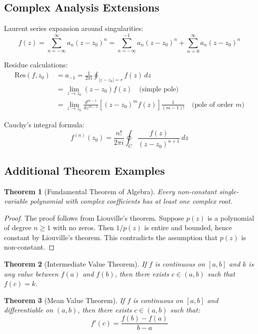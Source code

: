 \documentclass[12pt]{article}
\newtheorem{theorem}{Theorem}
\begin{document}
\subsection{Complex Analysis Extensions}

Laurent series expansion around singularities:
\begin{equation}
f(z) = \sum_{n=-\infty}^{\infty} a_n (z-z_0)^n = \sum_{n=-\infty}^{-1} a_n (z-z_0)^n + \sum_{n=0}^{\infty} a_n (z-z_0)^n
\end{equation}

Residue calculations:
\begin{align}
\text{Res}(f,z_0) &= a_{-1} = \frac{1}{2\pi i} \oint_{|z-z_0|=r} f(z) \, dz \\
&= \lim_{z \to z_0} (z-z_0) f(z) \quad \text{(simple pole)} \\
&= \lim_{z \to z_0} \frac{d^{m-1}}{dz^{m-1}} \left[(z-z_0)^m f(z)\right] \frac{1}{(m-1)!} \quad \text{(pole of order } m \text{)}
\end{align}

Cauchy's integral formula:
\begin{equation}
f^{(n)}(z_0) = \frac{n!}{2\pi i} \oint_C \frac{f(z)}{(z-z_0)^{n+1}} \, dz
\end{equation}

\subsection{Additional Theorem Examples}

\begin{theorem}[Fundamental Theorem of Algebra]
Every non-constant single-variable polynomial with complex coefficients has at least one complex root.
\end{theorem}

\begin{proof}
The proof follows from Liouville's theorem. Suppose $p(z)$ is a polynomial of degree $n \geq 1$ with no zeros. Then $1/p(z)$ is entire and bounded, hence constant by Liouville's theorem. This contradicts the assumption that $p(z)$ is non-constant.
\end{proof}

\begin{theorem}[Intermediate Value Theorem]
If $f$ is continuous on $[a,b]$ and $k$ is any value between $f(a)$ and $f(b)$, then there exists $c \in (a,b)$ such that $f(c) = k$.
\end{theorem}

\begin{theorem}[Mean Value Theorem]
If $f$ is continuous on $[a,b]$ and differentiable on $(a,b)$, then there exists $c \in (a,b)$ such that:
\begin{equation}
f'(c) = \frac{f(b) - f(a)}{b - a}
\end{equation}
\end{theorem}
\end{document}
